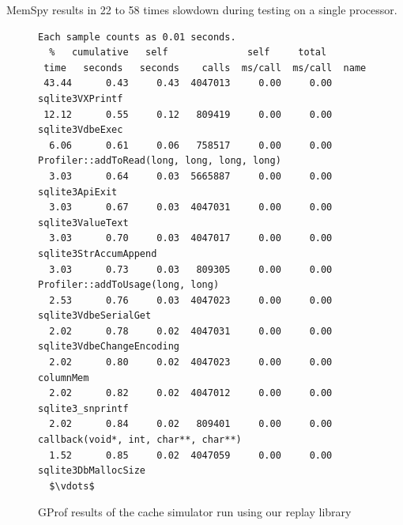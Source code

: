 MemSpy results in 22 to 58 times slowdown during testing on a single processor.


\begin{figure}
  \lstset{basicstyle=\footnotesize, mathescape=true}
  \begin{lstlisting}
Each sample counts as 0.01 seconds.
  %   cumulative   self              self     total           
 time   seconds   seconds    calls  ms/call  ms/call  name    
 43.44      0.43     0.43  4047013     0.00     0.00  sqlite3VXPrintf
 12.12      0.55     0.12   809419     0.00     0.00  sqlite3VdbeExec
  6.06      0.61     0.06   758517     0.00     0.00  Profiler::addToRead(long, long, long, long)
  3.03      0.64     0.03  5665887     0.00     0.00  sqlite3ApiExit
  3.03      0.67     0.03  4047031     0.00     0.00  sqlite3ValueText
  3.03      0.70     0.03  4047017     0.00     0.00  sqlite3StrAccumAppend
  3.03      0.73     0.03   809305     0.00     0.00  Profiler::addToUsage(long, long)
  2.53      0.76     0.03  4047023     0.00     0.00  sqlite3VdbeSerialGet
  2.02      0.78     0.02  4047031     0.00     0.00  sqlite3VdbeChangeEncoding
  2.02      0.80     0.02  4047023     0.00     0.00  columnMem
  2.02      0.82     0.02  4047012     0.00     0.00  sqlite3_snprintf
  2.02      0.84     0.02   809401     0.00     0.00  callback(void*, int, char**, char**)
  1.52      0.85     0.02  4047059     0.00     0.00  sqlite3DbMallocSize
  $\vdots$
  \end{lstlisting}
  \caption{GProf results of the cache simulator run using our replay library}
  \label{fig:profiler}
\end{figure}
